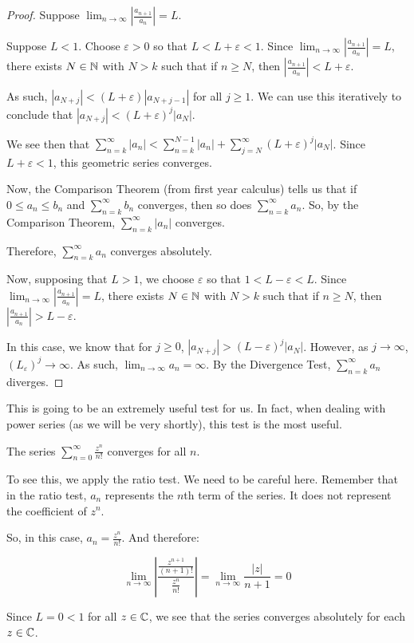 \begin{proof} Suppose $\displaystyle\lim_{n\rightarrow \infty} \left| \frac{a_{n+1}}{a_n}\right| = L$.

Suppose $L < 1$. Choose $\varepsilon > 0$ so that $L < L + \varepsilon < 1$. Since $\displaystyle\lim_{n\rightarrow \infty} \left| \frac{a_{n+1}}{a_n}\right| = L$, there exists $N \in \mathbb{N}$ with $N > k$ such that if $n \ge N$, then $\displaystyle \left| \frac{a_{n+1}}{a_n}\right| < L + \varepsilon$.

As such, $|a_{N+j}| < (L + \varepsilon)|a_{N + j - 1}|$ for all $j \ge 1$. We can use this iteratively to conclude that $|a_{N+j}| < (L + \varepsilon)^j|a_N|$.

We see then that $\sum_{n = k}^\infty |a_n| < \sum_{n = k}^{N-1} |a_n| + \sum_{j = N}^\infty (L + \varepsilon)^j|a_N|$. Since $L + \varepsilon < 1$, this geometric series converges.

Now, the Comparison Theorem (from first year calculus) tells us that if $0 \le a_n \le b_n$ and $\sum_{n = k}^\infty b_n$ converges, then so does $\sum_{n = k}^\infty a_n$. So, by the Comparison Theorem, $\sum_{n = k}^\infty |a_n|$ converges.

Therefore, $\sum_{n=k}^\infty a_n$ converges absolutely.

Now, supposing that $L > 1$, we choose $\varepsilon$ so that $1 < L - \varepsilon < L$. Since $\displaystyle\lim_{n\rightarrow \infty} \left| \frac{a_{n+1}}{a_n}\right| = L$, there exists $N \in \mathbb{N}$ with $N > k$ such that if $n \ge N$, then $\displaystyle \left| \frac{a_{n+1}}{a_n}\right| > L - \varepsilon$.

In this case, we know that for $j \ge 0$, $|a_{N + j}| > (L - \varepsilon)^j|a_N|$. However, as $j\rightarrow \infty$,  $(L_\varepsilon)^j \rightarrow \infty$. As such, $\lim_{n \rightarrow \infty} a_n = \infty$. By the Divergence Test, $\sum_{n = k}^\infty a_n$ diverges.

\end{proof}

This is going to be an extremely useful test for us. In fact, when dealing with power series (as we will be very shortly), this test is the most useful.

\begin{ex}{}{} The series $\sum_{n = 0}^\infty \frac{z^n}{n!}$ converges for all $n$.

To see this, we apply the ratio test. We need to be careful here. Remember that in the ratio test, $a_n$ represents the $n$th term of the series. It does not represent the coefficient of $z^n$.

So, in this case, $a_n = \frac{z^n}{n!}$. And therefore:

$$\lim_{n\rightarrow \infty} \left| \frac{\frac{z^{n+1}}{(n+1)!}}{\frac{z^n}{n!}}\right| = \lim_{n\rightarrow \infty} \frac{|z|}{n+1} = 0$$

Since $L = 0 < 1$ for all $z\in \mathbb{C}$, we see that the series converges absolutely for each $z\in \mathbb{C}$.
\end{ex}

